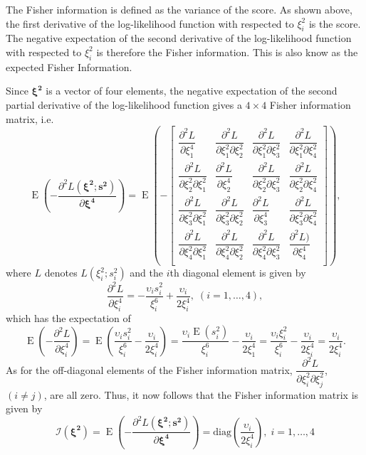 \documentclass[12pt,a4paper]{article}
\begin{document}
The Fisher information is defined as the variance of the score. As shown above, the first derivative of the log-likelihood function with respected to $\xi_i^2$ is the score. The negative expectation of the second derivative of the log-likelihood function with respected to $\xi_i^2$ is therefore the Fisher information. This is also know as the expected Fisher Information.

Since $\bm{\xi^2}$ is a vector of four elements, the negative expectation of the second partial derivative of the log-likelihood function gives a $4 \times 4$ Fisher information matrix, i.e.\
\[  \operatorname{E} \left(-\dfrac{\partial^2 L(\bm{\xi^2};\bm{s^2})}{\partial \bm{\xi^4}}\right) =  \operatorname{E}\left( -\begin{bmatrix}               
\dfrac{\partial^2 L}{\partial \xi_1^4} &  \dfrac{\partial^2 L}{\partial \xi_1^2\partial \xi_2^2} &  \dfrac{\partial^2 L}{\partial \xi_1^2\partial \xi_3^2} & \dfrac{\partial^2 L}{\partial \xi_1^2\partial \xi_4^2}  \\
 \dfrac{\partial^2 L}{\partial \xi_2^2\partial \xi_1^2} & \dfrac{\partial^2 L}{\partial \xi_2^4} &  \dfrac{\partial^2 L}{\partial \xi_2^2\partial \xi_3^2} & \dfrac{\partial^2 L}{\partial \xi_2^2\partial \xi_4^2} \\
 \dfrac{\partial^2 L}{\partial \xi_3^2\partial \xi_1^2} &  \dfrac{\partial^2 L}{\partial \xi_3^2\partial \xi_2^2} & \dfrac{\partial^2 L}{\partial \xi_3^4} &  \dfrac{\partial^2 L}{\partial \xi_3^2\partial \xi_4^2}  \\
\dfrac{\partial^2 L}{\partial \xi_4^2\partial \xi_1^2} & \dfrac{\partial^2 L}{\partial \xi_4^2\partial \xi_2^2} &  \dfrac{\partial^2 L}{\partial \xi_4^2\partial \xi_3^2} & \dfrac{\partial^2 L)}{\partial \xi_4^4} \\
\end{bmatrix}\right),  \] 
where $L$ denotes $L(\xi_i^2;s_i^2)$ and the $i$th diagonal element is given by
\[\dfrac{\partial^2 L}{\partial \xi_i^4} = -\dfrac{\upsilon_i s_i^2 }{\xi_i^6} + \dfrac{\upsilon_i }{2\xi_i^4},\; ( i = 1, \dots, 4), \]
which has the expectation of
\[ \operatorname{E} \left( -\dfrac{\partial^2 L}{\partial \xi_i^4} \right) = \operatorname{E} \left(\dfrac{\upsilon_i s_i^2 }{\xi_i^6} - \dfrac{\upsilon_i }{2\xi_i^4}\right) = \dfrac{\upsilon_i  \operatorname{E}(s_i^2) }{\xi_i^6} - \dfrac{\upsilon_i }{2\xi_1^4} =  \dfrac{\upsilon_i  \xi_i^2 }{\xi_i^6} - \dfrac{\upsilon_i }{2\xi_i^4} =  \dfrac{\upsilon_i }{2\xi_i^4}.\] As for the off-diagonal elements of the Fisher information matrix, $\dfrac{\partial^2 L}{\partial \xi_i^2\partial \xi_j^2}$, $(i \neq j)$, are all zero. Thus, it now follows that the Fisher information matrix is given by 
\[\mathcal{I}(\bm{\xi^2}) =  \operatorname{E} \left(-\dfrac{\partial^2 L(\bm{\xi^2};\bm{s^2})}{\partial \bm{\xi^4}}\right) = \mathrm{diag} \left( \dfrac{\upsilon_i }{2\xi_i^4}\right),\; i = 1, \dots, 4 \]
\end{document}
